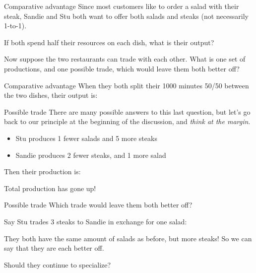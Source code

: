 \documentclass[aspectratio=169]{beamer}
\begin{document}
\begin{frame}{Comparative advantage}
    Since most customers like to order a salad with their steak, Sandie and Stu both want to offer both salads and steaks (not necessarily 1-to-1).

    \medskip

    If both spend half their resources on each dish, what is their output?

    \medskip

    Now suppose the two restaurants can trade with each other. What is one set of productions, and one possible trade, which would leave them both better off?

\end{frame} 

\begin{frame}{Comparative advantage}
    When they both split their 1000 minutes 50/50 between the two dishes, their output is:

    

\end{frame} 

\begin{frame}{Possible trade}
    There are many possible answers to this last question, but let's go back to our principle at the beginning of the discussion, and \textit{think at the margin}.
    \begin{itemize}
        \item Stu produces 1 fewer salads and 5 more steaks
        \item Sandie produces 2 fewer steaks, and 1 more salad
    \end{itemize}
    Then their production is:

    

    Total production has gone up!
\end{frame} 

\begin{frame}{Possible trade}
    Which trade would leave them both better off?

    \medskip

    Say Stu trades 3 steaks to Sandie in exchange for one salad:

    

    They both have the same amount of salads as before, but more steaks! So we can say that they are each better off.

    \medskip
    
    Should they continue to specialize?

\end{frame} 
\end{document}

